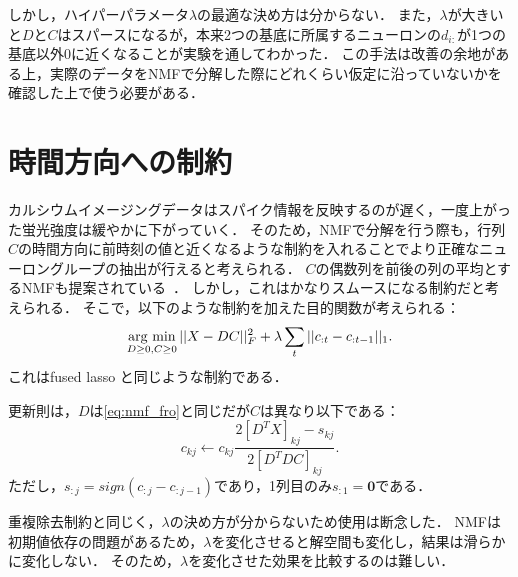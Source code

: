 しかし，ハイパーパラメータ$\lambda$の最適な決め方は分からない．
また，$\lambda$が大きいと$D$と$C$はスパースになるが，本来2つの基底に所属するニューロンの$d_{i:}$が1つの基底以外0に近くなることが実験を通してわかった．
この手法は改善の余地がある上，実際のデータをNMFで分解した際にどれくらい仮定に沿っていないかを確認した上で使う必要がある．

\section{時間方向への制約}
カルシウムイメージングデータはスパイク情報を反映するのが遅く，一度上がった蛍光強度は緩やかに下がっていく．
そのため，NMFで分解を行う際も，行列$C$の時間方向に前時刻の値と近くなるような制約を入れることでより正確なニューロングループの抽出が行えると考えられる．
$C$の偶数列を前後の列の平均とするNMFも提案されている~\cite{Cheung2015}．
しかし，これはかなりスムースになる制約だと考えられる．
そこで，以下のような制約を加えた目的関数が考えられる：
\begin{equation}
	\mathop{\textrm{arg~min}}\limits_{D \geq 0, C \geq 0}||X - DC||^2_F + \lambda \sum_t||c_{:t} - c_{:t-1}||_1.
  \label{eq:NMF-ar}
\end{equation}
これはfused lasso \cite{Tibshirani2005}と同じような制約である．

更新則は，$D$は\eqref{eq:nmf_fro}と同じだが$C$は異なり以下である：
\begin{equation}
	c_{kj} \leftarrow c_{kj} \frac{2[D^T X]_{kj} - s_{kj}}{2[D^T DC]_{kj}}.
\end{equation}
ただし，$s_{:j} = sign(c_{:j} - c_{:j-1})$であり，1列目のみ$s_{:1} = \mathbf{0}$である．

重複除去制約と同じく，$\lambda$の決め方が分からないため使用は断念した．
NMFは初期値依存の問題があるため，$\lambda$を変化させると解空間も変化し，結果は滑らかに変化しない．
そのため，$\lambda$を変化させた効果を比較するのは難しい．
